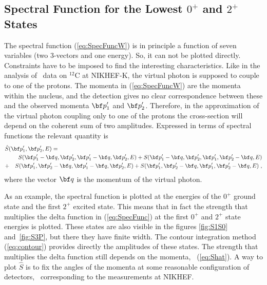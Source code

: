 \subsection{Spectral Function for the Lowest $0^+$ and $2^+$ States}
{\def\pone{\rvec{p}'_1}\def\ptwo{\rvec{p}'_2}\def\q{\rvec{q}}%
The spectral function (\ref{eq:SpecFuncW}) is in principle a function of 
seven variables (two 3-vectors and one energy). So, it can not be 
plotted directly. 
Constraints have to be imposed to find the interesting characteristics.
Like in the analysis of \eepp\ data on $^{12}$C at 
NIKHEF-K\cite{Kes93,GP91}, the virtual photon is supposed to couple to
one of the protons. 
The momenta in (\ref{eq:SpecFuncW}) are the momenta within the nucleus, and
the detection gives no clear correspondence between these and the observed 
momenta $\pone$ and $\ptwo$. Therefore, in the approximation of the virtual
photon coupling only to one of the protons the cross-section will depend 
on the coherent sum of two amplitudes. Expressed in terms of spectral 
functions the relevant quantity is
%
	\begin{eqnarray}
	\lefteqn{%
		\hat{S}(\pone, \ptwo, E)
	=} 
	\label{eq:Shat}
	&&\\
	&&
		 S( \pone-\q, \ptwo, \pone-\q, \ptwo, E )
		+S( \pone-\q, \ptwo, \pone, \ptwo-\q, E )
	\nonumber \\
	&+&
		 S( \pone, \ptwo-\q, \pone-\q, \ptwo, E )
		+S( \pone, \ptwo-\q, \pone, \ptwo-\q, E ) 
	\nonumber
	\;,
	\end{eqnarray}
where the vector $\q$ is the momentum of the virtual photon. 
} 

As an example, the spectral function is plotted at the energies
of the $0^+$ ground state and the first $2^+$ excited state.
This means that in fact the strength that multiplies the delta function in
(\ref{eq:SpecFunc}) at the first $0^+$ and $2^+$ state energies is plotted. 
These states
are also visible in the figures \ref{fig:S1S0} and~\ref{fig:S3P}, but there
they have finite width. The contour integration method  (\ref{eq:contour})
provides directly the amplitudes of these states.
The strength that multiplies the delta function still depends on the 
momenta, \cf\ 
(\ref{eq:Shat}). A way to plot $\hat{S}$ is to
fix the angles of the momenta at some reasonable configuration of detectors,
\eg\ corresponding  to the measurements at NIKHEF\cite{Prop}. 

